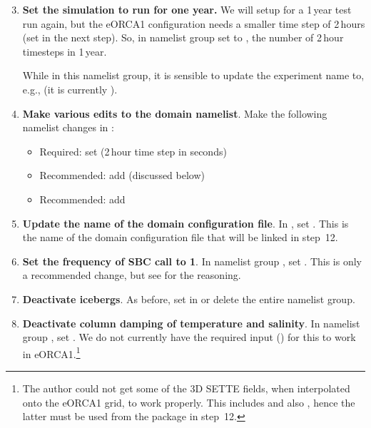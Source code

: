 \begin{enumerate}\setcounter{enumi}{2}
    \item \textbf{Set the simulation to run for one year.}
        We will setup for a 1\,year test run again, but the eORCA1 configuration needs a smaller time step of 2\,hours (set in the next step).
        So, in namelist group  set  to , the number of 2\,hour timesteps in 1\,year.

        While in this namelist group, it is sensible to update the experiment name  to, e.g.,  (it is currently ).

    \item \textbf{Make various edits to the domain namelist}.
        Make the following namelist changes in :
        \begin{itemize}
            \item Required: set  (2\,hour time step in seconds)
            \item Recommended: add  (discussed below)
            \item Recommended: add 
        \end{itemize}

    \item \textbf{Update the name of the domain configuration file}.
        In , set .
        This is the name of the domain configuration file that will be linked in step~12.

    \item \textbf{Set the frequency of SBC call to 1}.
        In namelist group , set .
        This is only a recommended change, but see  for the reasoning.

    \item \textbf{Deactivate icebergs}.
        As before, set  in  or delete the entire namelist group.

    \item \textbf{Deactivate column damping of temperature and salinity}.
        In namelist group , set .
        We do not currently have the required input () for this to work in eORCA1.\footnote{
            The author could not get some of the 3D SETTE fields, when interpolated onto the eORCA1 grid, to work properly.
            This includes  and also , hence the latter must be used from the \citet{delavergne2024eorca1} package in step~12.}

\end{enumerate}

